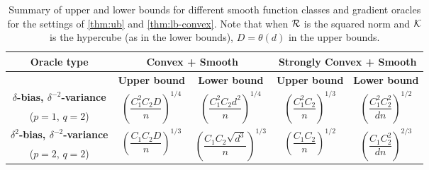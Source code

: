 \begin{table*}
\small
\centering
 \caption{Summary of upper and lower bounds for different smooth function classes and  gradient oracles for the settings of \cref{thm:ub} and \cref{thm:lb-convex}. Note that when $\mathcal{R}$ is the squared norm and $\mathcal{K}$ is the hypercube (as in the lower bounds), $D=\theta(d)$ in the upper bounds.}
\label{tab:mse-1}
 \begin{tabular}{|c|c|c|c|c|}
\toprule
  \multirow{2}{*}{\textbf{Oracle type}} & \multicolumn{2}{c}{\multirow{2}{*}{\textbf{Convex + Smooth}}} & \multicolumn{2}{|c|}{\multirow{2}{*}{\textbf{Strongly Convex + Smooth}}} \\[1em]
 \midrule
 & \textbf{Upper bound} & \textbf{Lower bound} & \textbf{Upper bound} & \textbf{Lower bound}\\
 \midrule
\textbf{ $\delta$-bias, $\delta^{-2}$-variance} & \multirow{2}{*}{$\left(\dfrac{C_1^{2}C_2 D}{n}\right)^{1/4}$}  & \multirow{2}{*}{$\left(\dfrac{C_1^2 C_2 d^2}{n}\right)^{1/4}$}& \multirow{2}{*}{$\left(\dfrac{C_1^2 C_2}{n}\right)^{1/3}$}  & \multirow{2}{*}{$\left(\dfrac{C_1^2 C_2^2}{d n}\right)^{1/2}$} \\[0.5ex]
 ($p=1$, $q=2$) & & & &\\\midrule
\textbf{$\delta^2$-bias, $\delta^{-2}$-variance } & \multirow{2}{*}{$\left(\dfrac{C_1 C_2 D}{n}\right)^{1/3}$}  & \multirow{2}{*}{$\left(\dfrac{C_1 C_2 \sqrt{d^3}}{n}\right)^{1/3}$} & \multirow{2}{*}{$\left(\dfrac{C_1 C_2}{n}\right)^{1/2}$}  & \multirow{2}{*}{$\left(\dfrac{C_1 C_2^2 }{d n}\right)^{2/3}$}\\[1.4ex]
 ($p=2$, $q=2$) & & & &\\
\bottomrule
\end{tabular}
\end{table*}


